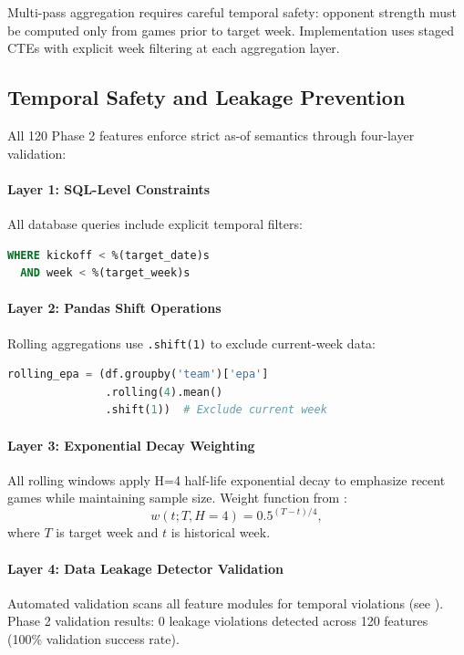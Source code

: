 Multi-pass aggregation requires careful temporal safety: opponent strength must be computed only from games prior to target week. Implementation uses staged CTEs with explicit week filtering at each aggregation layer.

\subsection{Temporal Safety and Leakage Prevention}
\label{subsec:phase2-temporal-safety}

All 120 Phase 2 features enforce strict as-of semantics through four-layer validation:

\paragraph{Layer 1: SQL-Level Constraints}
All database queries include explicit temporal filters:
\begin{lstlisting}[language=SQL,basicstyle=\ttfamily\footnotesize]
WHERE kickoff < %(target_date)s
  AND week < %(target_week)s
\end{lstlisting}

\paragraph{Layer 2: Pandas Shift Operations}
Rolling aggregations use \texttt{.shift(1)} to exclude current-week data:
\begin{lstlisting}[language=Python,basicstyle=\ttfamily\footnotesize]
rolling_epa = (df.groupby('team')['epa']
               .rolling(4).mean()
               .shift(1))  # Exclude current week
\end{lstlisting}

\paragraph{Layer 3: Exponential Decay Weighting}
All rolling windows apply H=4 half-life exponential decay to emphasize recent games while maintaining sample size. Weight function from :
\begin{equation}
w(t; T, H=4) = 0.5^{(T - t)/4},
\end{equation}
where $T$ is target week and $t$ is historical week.

\paragraph{Layer 4: Data Leakage Detector Validation}
Automated validation scans all feature modules for temporal violations (see ). Phase 2 validation results: 0 leakage violations detected across 120 features (100\% validation success rate).

